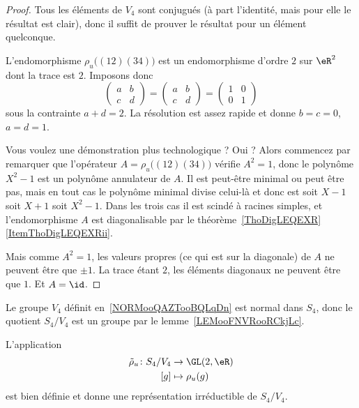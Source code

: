 \begin{proof}
	Tous les éléments de \( V_4\) sont conjugués (à part l'identité, mais pour elle le résultat est clair), donc il suffit de prouver le résultat pour un élément quelconque.

	L'endomorphisme \( \rho_u\big( (12)(34) \big)\) est un endomorphisme d'ordre \( 2\) sur \( \eR^2\) dont la trace est \( 2\). Imposons donc
	\begin{equation}
		\begin{pmatrix}
			a & b \\
			c & d
		\end{pmatrix}=\begin{pmatrix}
			a & b \\
			c & d
		\end{pmatrix}=\begin{pmatrix}
			1 & 0 \\
			0 & 1
		\end{pmatrix}
	\end{equation}
	sous la contrainte \( a+d=2\). La résolution est assez rapide et donne \( b=c=0\), \( a=d=1\).

	Vous voulez une démonstration plus technologique ? Oui ? Alors commencez par remarquer que l'opérateur \( A=\rho_u\big( (12)(34) \big)\) vérifie \( A^2=1\), donc le polynôme \( X^2-1\) est un polynôme annulateur de \( A\). Il est peut-être minimal ou peut être pas, mais en tout cas le polynôme minimal divise celui-là et donc est soit \( X-1\) soit \( X+1\) soit \( X^2-1\). Dans les trois cas il est scindé à racines simples, et l'endomorphisme \( A\) est diagonalisable par le théorème~\ref{ThoDigLEQEXR}\ref{ItemThoDigLEQEXRii}.

	Mais comme \( A^2=1\), les valeurs propres (ce qui est sur la diagonale) de \( A\) ne peuvent être que \( \pm1\). La trace étant \( 2\), les éléments diagonaux ne peuvent être que \( 1\). Et \( A=\id\).
\end{proof}


Le groupe \( V_4\) définit en~\ref{NORMooQAZTooBQLqDn} est normal dans \( S_4\), donc le quotient \( S_4/V_4\) est un groupe par le lemme~\ref{LEMooFNVRooRCkjLc}.

\begin{lemma}
	L'application
	\begin{equation}
		\begin{aligned}
			\tilde \rho_u\colon S_4/V_4 & \to \GL(2,\eR)    \\
			[g]                         & \mapsto \rho_u(g)
		\end{aligned}
	\end{equation}
	est bien définie et donne une représentation irréductible de \( S_4/V_4\).
\end{lemma}

